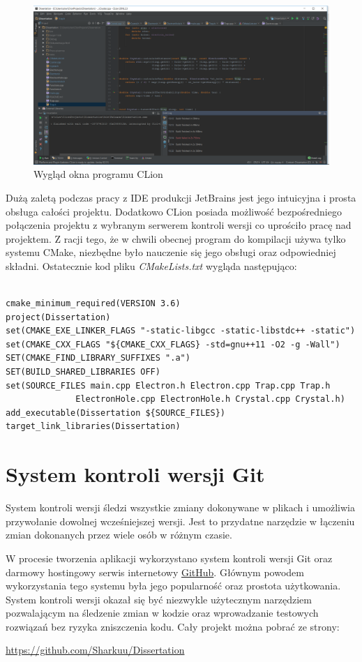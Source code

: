 \begin{figure}[h]
\centering
\includegraphics[width=17cm]{clion}
\caption{Wygląd okna programu CLion}
\label{fig:clion}
\end{figure}

Dużą zaletą podczas pracy z IDE produkcji JetBrains jest jego intuicyjna i prosta obsługa całości projektu. Dodatkowo CLion posiada możliwość bezpośredniego połączenia projektu z wybranym serwerem kontroli wersji co uprościło pracę nad projektem. Z racji tego, że w chwili obecnej program do kompilacji używa tylko systemu CMake, niezbędne było nauczenie się jego obsługi oraz odpowiedniej składni.
Ostatecznie kod pliku \emph{CMakeLists.txt} wygląda następująco:
\begin{verbatim}

cmake_minimum_required(VERSION 3.6)
project(Dissertation)
set(CMAKE_EXE_LINKER_FLAGS "-static-libgcc -static-libstdc++ -static")
set(CMAKE_CXX_FLAGS "${CMAKE_CXX_FLAGS} -std=gnu++11 -O2 -g -Wall")
SET(CMAKE_FIND_LIBRARY_SUFFIXES ".a")
SET(BUILD_SHARED_LIBRARIES OFF)
set(SOURCE_FILES main.cpp Electron.h Electron.cpp Trap.cpp Trap.h 
			  ElectronHole.cpp ElectronHole.h Crystal.cpp Crystal.h)
add_executable(Dissertation ${SOURCE_FILES})
target_link_libraries(Dissertation)

\end{verbatim}
\section{System kontroli wersji Git}

System kontroli wersji śledzi wszystkie zmiany dokonywane w plikach i umożliwia przywołanie dowolnej wcześniejszej wersji. Jest to przydatne narzędzie w łączeniu zmian dokonanych przez wiele osób w różnym czasie.

W procesie tworzenia aplikacji wykorzystano system kontroli wersji Git oraz darmowy hostingowy serwis internetowy \href{https://github.com/}{GitHub}.
Głównym powodem wykorzystania tego systemu była jego popularność oraz prostota użytkowania.
System kontroli wersji okazał się być niezwykle użytecznym narzędziem pozwalającym na
śledzenie zmian w kodzie oraz wprowadzanie testowych rozwiązań bez
ryzyka zniszczenia kodu. Cały projekt można pobrać ze strony:
\begin{center}
\url{https://github.com/Sharkuu/Dissertation}
\end{center}

